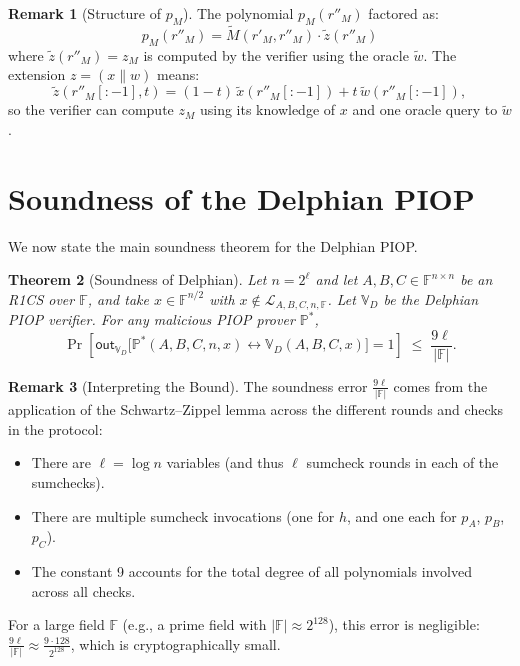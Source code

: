 \documentclass[11pt]{article}
\theoremstyle{plain}
\newtheorem{theorem}{Theorem}[section]
\theoremstyle{definition}
\newtheorem{remark}[theorem]{Remark}
\newcommand{\F}{\mathbb{F}}
\newcommand{\out}{\mathsf{out}}
\begin{document}
\begin{remark}[Structure of $p_M$]
  The polynomial $p_M(r''_M)$ factored as:
  \[
    p_M(r''_M) = \tilde{M}(r'_M, r''_M) \cdot \tilde{z}(r''_M)
  \]
  where $\tilde{z}(r''_M) = z_M$ is computed by the verifier using
  the oracle $\tilde{w}$. The extension $z = (x \| w)$ means:
  \[
    \tilde{z}(r''_M[:-1], t) =
      (1 - t)\,\tilde{x}(r''_M[:-1]) + t\,\tilde{w}(r''_M[:-1]),
  \]
  so the verifier can compute $z_M$ using its knowledge of $x$ and one oracle
  query to $\tilde{w}$.
\end{remark}

\section{Soundness of the Delphian PIOP}

We now state the main soundness theorem for the Delphian PIOP.

\begin{thmbox}
\begin{theorem}[Soundness of Delphian]
  Let $n = 2^\ell$ and let $A, B, C \in \F^{n \times n}$ be an R1CS over $\F$,
  and take $x \in \F^{n/2}$ with $x \notin \mathcal{L}_{A,B,C,n,\F}$.
  Let $\mathbb{V}_D$ be the Delphian PIOP verifier. For any malicious PIOP
  prover $\mathbb{P}^*$,
  \[
    \Pr\!\left[\out_{\mathbb{V}_D}\!\bigl[
      \mathbb{P}^*(A, B, C, n, x) \leftrightarrow \mathbb{V}_D(A, B, C, x)
    \bigr] = 1\right] \;\leq\; \frac{9\ell}{|\F|}.
  \]
\end{theorem}
\end{thmbox}

\begin{remark}[Interpreting the Bound]
  The soundness error $\frac{9\ell}{|\F|}$ comes from the application of the
  Schwartz--Zippel lemma across the different rounds and checks in the protocol:
  \begin{itemize}
    \item There are $\ell = \log n$ variables (and thus $\ell$ sumcheck rounds
      in each of the sumchecks).
    \item There are multiple sumcheck invocations (one for $h$, and one each
      for $p_A$, $p_B$, $p_C$).
    \item The constant 9 accounts for the total degree of all polynomials
      involved across all checks.
  \end{itemize}
  For a large field $\F$ (e.g., a prime field with $|\F| \approx 2^{128}$), this
  error is negligible: $\frac{9\ell}{|\F|} \approx \frac{9 \cdot 128}{2^{128}}$,
  which is cryptographically small.
\end{remark}
\end{document}
